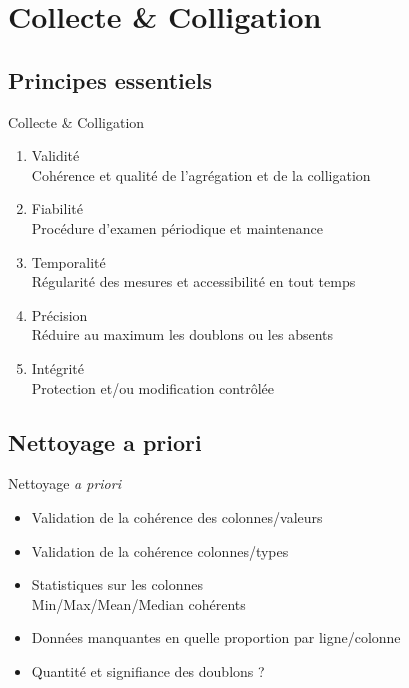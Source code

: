 \documentclass[french]{beamer}
\begin{document}
\section{Collecte \& Colligation}

\subsection{Principes essentiels}
\begin{frame}{Collecte \& Colligation}
\begin{enumerate}
	\item Validité\\
	Cohérence et qualité de l'agrégation et de la colligation
	\item Fiabilité\\
	Procédure d'examen périodique et maintenance
	\item Temporalité\\
	Régularité des mesures et accessibilité en tout temps
	\item Précision\\
	Réduire au maximum les doublons ou les absents
	\item Intégrité\\
	Protection et/ou modification contrôlée
\end{enumerate} 
\end{frame}

\subsection{Nettoyage a priori}
\begin{frame}{Nettoyage \textit{a priori}}
	\begin{itemize}
		\item Validation de la cohérence des colonnes/valeurs
		\item Validation de la cohérence colonnes/types
		\item Statistiques sur les colonnes\\
		Min/Max/Mean/Median cohérents
		\item Données manquantes en quelle proportion par ligne/colonne
		\item Quantité et signifiance des doublons ?
	\end{itemize} 
\end{frame}
\end{document}
